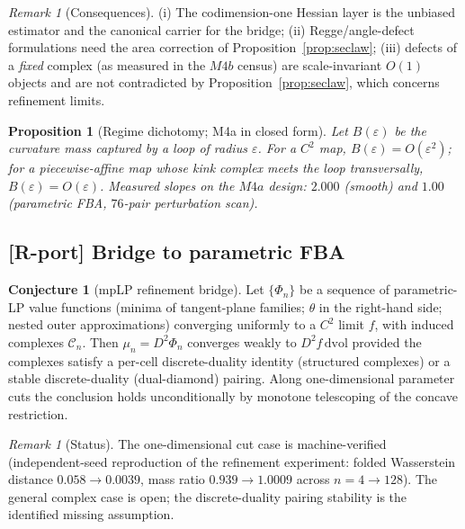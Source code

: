 \documentclass[11pt,a4paper]{article}
\theoremstyle{plain}
\newtheorem{proposition}[theorem]{Proposition}
\theoremstyle{definition}
\newtheorem{conjecture}[theorem]{Conjecture}
\theoremstyle{remark}
\newtheorem{remark}[theorem]{Remark}
\newcommand{\dvol}{\,\mathrm{dvol}}
\begin{document}
\begin{remark}[Consequences]
(i) The codimension-one Hessian layer is the unbiased estimator and the
canonical carrier for the bridge; (ii) Regge/angle-defect formulations
need the area correction of Proposition~\ref{prop:seclaw}; (iii) defects
of a \emph{fixed} complex (as measured in the $M4b$ census) are
scale-invariant $O(1)$ objects and are not contradicted by
Proposition~\ref{prop:seclaw}, which concerns refinement limits.
\end{remark}

\begin{proposition}[Regime dichotomy; M4a in closed form]
\label{prop:dichotomy}
Let $B(\varepsilon)$ be the curvature mass captured by a loop of radius
$\varepsilon$. For a $C^2$ map, $B(\varepsilon) = O(\varepsilon^2)$; for a
piecewise-affine map whose kink complex meets the loop transversally,
$B(\varepsilon) = O(\varepsilon)$. Measured slopes on the
$M4a$ design: $2.000$ (smooth) and $1.00$ (parametric FBA,
$76$-pair perturbation scan).
\end{proposition}

\subsection{[R-port] Bridge to parametric FBA}

\begin{conjecture}[mpLP refinement bridge]\label{conj:bridge}
Let $\{\Phi_n\}$ be a sequence of parametric-LP value functions (minima of
tangent-plane families; $\theta$ in the right-hand side; nested outer
approximations) converging uniformly to a $C^2$ limit $f$, with induced
complexes $\mathcal{C}_n$. Then $\mu_n = D^2\Phi_n$ converges weakly to
$D^2 f \dvol$ provided the complexes satisfy a per-cell discrete-duality
identity (structured complexes) or a stable discrete-duality
(dual-diamond) pairing. Along one-dimensional parameter cuts the
conclusion holds unconditionally by monotone telescoping of the concave
restriction.
\end{conjecture}

\begin{remark}[Status]
The one-dimensional cut case is machine-verified (independent-seed
reproduction of the refinement experiment: folded Wasserstein distance
$0.058 \to 0.0039$, mass ratio $0.939 \to 1.0009$ across
$n = 4 \to 128$). The general complex case is open; the discrete-duality
pairing stability is the identified missing assumption.
\end{remark}
\end{document}
